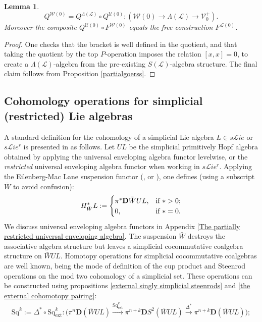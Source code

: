 \documentclass[11pt]{amsart} \renewcommand{\baselinestretch}{1.2}
\theoremstyle{plain}
\newtheorem{lem}[thm]{Lemma}
\numberwithin{equation}{section} %
\theoremstyle{plain}
\newtheorem{lem}[thm]{Lemma}
\numberwithin{equation}{chapter} %
\renewcommand{\to}{\longrightarrow}
\newcommand{\scrL}{\mathscr{L}}
\newcommand{\calU}{\mathcal{U}}
\newcommand{\calL}{\mathcal{L}}
\newcommand{\calV}{\mathcal{V}}
\newcommand{\calw}{\mathcal{W}}
\newcommand{\citeBOX}[2][]{\cite[\mbox{#1}]{#2}}
\newcommand{\LieOperad}{{\scrL}}
\newcommand{\vect}[2]{\calV^{#1}_{#2}}
\newcommand{\ExtCohOp}{\mathrm{Sq}_\mathrm{ext}}
\newcommand{\Sq}{\mathrm{Sq}}
\newcommand{\liealgs}{{\scrL\!\textit{ie}}}
\newcommand{\restliealgs}{{\scrL\!\textit{ie}^\textit{r}}}
\newcommand{\dual}{\mathbf{D}}
\newcommand{\SubsectionOrSection}[1]{\subsection{#1}}
\begin{document}
\begin{Constructing cohomology operations}
\begin{lem}
\[Q^{\calw(0)}=Q^{\Lambda(\LieOperad)}\circ Q^{\calU(0)}:\left(\calw(0)\to \Lambda(\LieOperad)\to \vect{+}{0}\right).\]
Moreover the composite $Q^{\calU(0)}\circ F^{\calw(0)}$ equals the free construction $F^{\calL(0)}$.
\end{lem}
\begin{proof}
One checks that the bracket is well defined in the quotient, and that taking the quotient by the top $P$-operation imposes the relation $[x,x]=0$, to create a $\Lambda(\LieOperad)$-algebra from the pre-existing $S(\LieOperad)$-algebra structure. The final claim follows from Proposition \ref{partialgoerss}.
\end{proof}
\SubsectionOrSection{Cohomology operations for simplicial (restricted) Lie algebras}
\label{section: Cohomology operations for simplicial (restricted) Lie algebras}
A standard definition for the cohomology of a simplicial Lie algebra $L\in s\liealgs$ or $s\restliealgs$ is presented in \cite{PriddySimplicialLie.pdf} as follows. Let $UL$ be the simplicial primitively Hopf algebra obtained by applying the universal enveloping algebra functor levelwise, or the \emph{restricted} universal enveloping algebra functor when working in $s\restliealgs$. %
Applying the Eilenberg-Mac Lane suspension functor (\citeBOX[\S2.3]{PriddySimplicialLie.pdf}, \citeBOX[\S5]{MillerSullivanConjecture.pdf} or \citeBOX[p.~87]{MaySimpObj.pdf}), one defines (using a subscript $\bar{W}$ to avoid confusion):
\[H_{\bar{W}}^*L:=\begin{cases}
\pi^*\dual\bar{W}UL,&\textup{if }*>0;\\
0,&\textup{if }*=0.
\end{cases}\]
We discuss universal enveloping algebra functors in Appendix \ref{The partially restricted universal enveloping algebra}.
The suspension $\bar{W}$ destroys the associative algebra structure but leaves a simplicial cocommutative coalgebra structure on $\bar{W}UL$. Homotopy operations for simplicial cocommutative coalgebras are well known, being the mode of definition of the cup product and Steenrod operations on the mod two cohomology of a simplicial set. These operations can be constructed using  propositions \ref{external singly simplicial steenrods} and \ref{the external cohomotopy pairing}:
\begin{gather*}
\Sq^k:=\Delta^*\circ\ExtCohOp^k:\bigl(\pi^n\dual (\bar{W}UL)\overset{\ExtCohOp^k}{\to}\pi^{n+k}\dual S^2(\bar{W}UL)\overset{\Delta^*}{\to}\pi^{n+k}\dual (\bar{W}UL)\bigr);\\

\end{gather*}
\end{Constructing cohomology operations}
\end{document}

